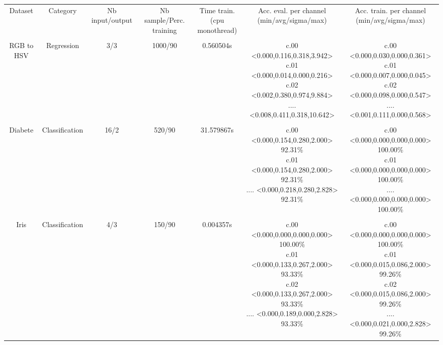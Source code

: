 \documentclass[8pt, a4paper]{article}
\begin{document}
\begin{landscape}
\begin{tabular}{|c|c|c|c|c|c|c|}
\hline
Dataset & Category & Nb input/output & Nb sample/Perc. training & \makecell{Time train.\\(cpu monothread)} & \makecell{Acc. eval. per channel\\(min/avg/sigma/max)} & \makecell{Acc. train. per channel\\(min/avg/sigma/max)}\\
\\
RGB to HSV & Regression & 3/3 & 1000/90 & 0.560504s & \makecell{c.00 <0.000,0.116,0.318,3.942>\\c.01 <0.000,0.014,0.000,0.216>\\c.02 <0.002,0.380,0.974,9.884>\\.... <0.008,0.411,0.318,10.642>\\} & \makecell{c.00 <0.000,0.030,0.000,0.361>\\c.01 <0.000,0.007,0.000,0.045>\\c.02 <0.000,0.098,0.000,0.547>\\.... <0.001,0.111,0.000,0.568>\\} \\
\hline
\\
Diabete & Classification & 16/2 & 520/90 & 31.579867s & \makecell{c.00 <0.000,0.154,0.280,2.000> 92.31\%\\c.01 <0.000,0.154,0.280,2.000> 92.31\%\\.... <0.000,0.218,0.280,2.828> 92.31\%\\} & \makecell{c.00 <0.000,0.000,0.000,0.000> 100.00\%\\c.01 <0.000,0.000,0.000,0.000> 100.00\%\\.... <0.000,0.000,0.000,0.000> 100.00\%\\} \\
\hline
\\
Iris & Classification & 4/3 & 150/90 & 0.004357s & \makecell{c.00 <0.000,0.000,0.000,0.000> 100.00\%\\c.01 <0.000,0.133,0.267,2.000> 93.33\%\\c.02 <0.000,0.133,0.267,2.000> 93.33\%\\.... <0.000,0.189,0.000,2.828> 93.33\%\\} & \makecell{c.00 <0.000,0.000,0.000,0.000> 100.00\%\\c.01 <0.000,0.015,0.086,2.000> 99.26\%\\c.02 <0.000,0.015,0.086,2.000> 99.26\%\\.... <0.000,0.021,0.000,2.828> 99.26\%\\} \\

\end{tabular}
\end{landscape}
\end{document}
